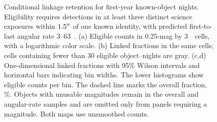 \begin{figure}[tbp]
\centering
{}
\caption{Conditional linkage retention for first-year known-object
nights. Eligibility requires detections in at least three distinct
science exposures within $1.5^{\prime\prime}$ of one known identity, with
predicted first-to-last angular rate $3$--$63$~\rateunit.
(a) Eligible counts in 0.25-mag by 3~\rateunit\ cells, with a
logarithmic color scale. (b) Linked fractions in the same cells;
cells containing fewer than 30 eligible object--nights are gray.
(c,d) One-dimensional linked fractions with 95\% Wilson intervals
and horizontal bars indicating bin widths. The lower histograms
show eligible counts per bin. The dashed line marks the overall
fraction, \yrRetention\%. Objects with unusable magnitudes remain
in the overall and angular-rate samples and are omitted only from
panels requiring a magnitude. Both maps use unsmoothed counts.}
\label{fig:retention}
\end{figure}
